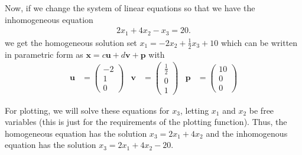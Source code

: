 \documentclass[
]{book}
\theoremstyle{definition}
\theoremstyle{definition}
\theoremstyle{definition}
\theoremstyle{remark}
\begin{document}
Now, if we change the system of linear equations so that we have the inhomogeneous equation
\[
\begin{aligned}
2x_1 + 4 x_2 - x_3 = 20.
\end{aligned}
\]
we get the homogeneous solution set \(x_1 = -2 x_2 + \frac{1}{2} x_3 + 10\) which can be written in parametric form as \(\mathbf{x} = c \mathbf{u} + d \mathbf{v} + \mathbf{p}\) with
\[
\begin{aligned}
\mathbf{u} & = \begin{pmatrix} -2 \\ 1 \\ 0 \end{pmatrix} & 
\mathbf{v} & = \begin{pmatrix} \frac{1}{2} \\ 0 \\ 1 \end{pmatrix} & 
\mathbf{p} & = \begin{pmatrix} 10 \\ 0 \\ 0 \end{pmatrix}
\end{aligned}
\]

For plotting, we will solve these equations for \(x_3\), letting \(x_1\) and \(x_2\) be free variables (this is just for the requirements of the plotting function). Thus, the homogeneous equation has the solution \(x_3 = 2x_1 + 4x_2\) and the inhomogenous equation has the solution \(x_3 = 2x_1 + 4x_2 - 20\).
\end{document}
